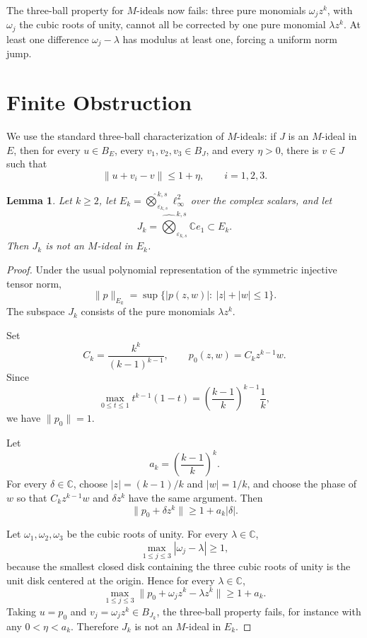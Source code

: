 \documentclass[11pt]{article}
\newtheorem{lemma}{Lemma}
\newcommand{\C}{\mathbb C}
\newcommand{\symten}[2]{\widehat{\bigotimes}^{#1,s}_{#2}}
\begin{document}
The three-ball property for \(M\)-ideals now fails: three pure monomials
\(\omega_j z^k\), with \(\omega_j\) the cubic roots of unity, cannot all be
corrected by one pure monomial \(\lambda z^k\). At least one difference
\(\omega_j-\lambda\) has modulus at least one, forcing a uniform norm jump.

\section*{Finite Obstruction}

We use the standard three-ball characterization of \(M\)-ideals: if \(J\) is
an \(M\)-ideal in \(E\), then for every \(u\in B_E\), every
\(v_1,v_2,v_3\in B_J\), and every \(\eta>0\), there is \(v\in J\) such that
\[
  \|u+v_i-v\|\le 1+\eta,\qquad i=1,2,3.
\]

\begin{lemma}
\label{lem:finite}
Let \(k\ge2\), let \(E_k=\symten{k}{\varepsilon_{k,s}}\ell_\infty^2\) over
the complex scalars, and let
\[
  J_k=\symten{k}{\varepsilon_{k,s}}\C e_1\subset E_k .
\]
Then \(J_k\) is not an \(M\)-ideal in \(E_k\).
\end{lemma}

\begin{proof}
Under the usual polynomial representation of the symmetric injective tensor
norm,
\[
  \|p\|_{E_k}
  = \sup\{ |p(z,w)|:\ |z|+|w|\le 1\}.
\]
The subspace \(J_k\) consists of the pure monomials \(\lambda z^k\).

Set
\[
  C_k=\frac{k^k}{(k-1)^{k-1}},
  \qquad
  p_0(z,w)=C_k z^{k-1}w .
\]
Since
\[
  \max_{0\le t\le1} t^{k-1}(1-t)
  =\left(\frac{k-1}{k}\right)^{k-1}\frac1k,
\]
we have \(\|p_0\|=1\).

Let
\[
  a_k=\left(\frac{k-1}{k}\right)^k.
\]
For every \(\delta\in\C\), choose
\(|z|=(k-1)/k\) and \(|w|=1/k\), and choose the phase of \(w\) so that
\(C_k z^{k-1}w\) and \(\delta z^k\) have the same argument. Then
\[
  \|p_0+\delta z^k\|\ge 1+a_k|\delta|.
\]

Let \(\omega_1,\omega_2,\omega_3\) be the cubic roots of unity. For every
\(\lambda\in\C\),
\[
  \max_{1\le j\le3}|\omega_j-\lambda|\ge 1,
\]
because the smallest closed disk containing the three cubic roots of unity is
the unit disk centered at the origin. Hence for every \(\lambda\in\C\),
\[
  \max_{1\le j\le3}
  \|p_0+\omega_j z^k-\lambda z^k\|
  \ge 1+a_k .
\]
Taking \(u=p_0\) and \(v_j=\omega_jz^k\in B_{J_k}\), the three-ball property
fails, for instance with any \(0<\eta<a_k\). Therefore \(J_k\) is not an
\(M\)-ideal in \(E_k\).
\end{proof}
\end{document}
